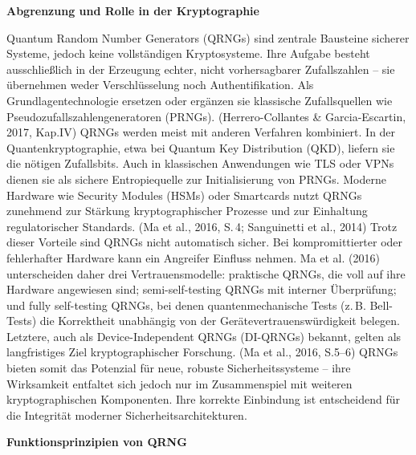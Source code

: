 \vspace{1em}
\noindent\textbf{Abgrenzung und Rolle in der Kryptographie}

\noindent
Quantum Random Number Generators (QRNGs) sind zentrale Bausteine sicherer Systeme, jedoch keine vollständigen Kryptosysteme. Ihre Aufgabe besteht ausschließlich in der Erzeugung echter, nicht vorhersagbarer Zufallszahlen – sie übernehmen weder Verschlüsselung noch Authentifikation. Als Grundlagentechnologie ersetzen oder ergänzen sie klassische Zufallsquellen wie Pseudozufallszahlengeneratoren (PRNGs).
 (Herrero-Collantes & Garcia-Escartin, 2017, Kap.IV)
QRNGs werden meist mit anderen Verfahren kombiniert. In der Quantenkryptographie, etwa bei Quantum Key Distribution (QKD), liefern sie die nötigen Zufallsbits. Auch in klassischen Anwendungen wie TLS oder VPNs dienen sie als sichere Entropiequelle zur Initialisierung von PRNGs. Moderne Hardware wie Security Modules (HSMs) oder Smartcards nutzt QRNGs zunehmend zur Stärkung kryptographischer Prozesse und zur Einhaltung regulatorischer Standards.
 (Ma et al., 2016, S. 4; Sanguinetti et al., 2014)
Trotz dieser Vorteile sind QRNGs nicht automatisch sicher. Bei kompromittierter oder fehlerhafter Hardware kann ein Angreifer Einfluss nehmen. Ma et al. (2016) unterscheiden daher drei Vertrauensmodelle: praktische QRNGs, die voll auf ihre Hardware angewiesen sind; semi-self-testing QRNGs mit interner Überprüfung; und fully self-testing QRNGs, bei denen quantenmechanische Tests (z. B. Bell-Tests) die Korrektheit unabhängig von der Gerätevertrauenswürdigkeit belegen. Letztere, auch als Device-Independent QRNGs (DI-QRNGs) bekannt, gelten als langfristiges Ziel kryptographischer Forschung.
 (Ma et al., 2016, S.5–6)
QRNGs bieten somit das Potenzial für neue, robuste Sicherheitssysteme – ihre Wirksamkeit entfaltet sich jedoch nur im Zusammenspiel mit weiteren kryptographischen Komponenten. Ihre korrekte Einbindung ist entscheidend für die Integrität moderner Sicherheitsarchitekturen.


\vspace{1em}
\noindent\textbf{Funktionsprinzipien von QRNG}

